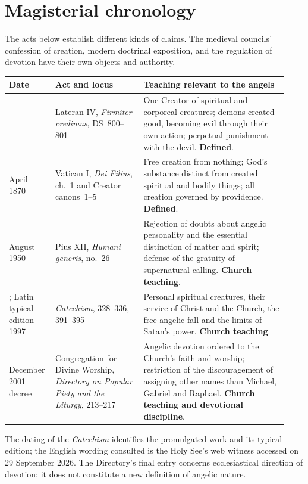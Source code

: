 \section{Magisterial chronology}
\label{app:magisterium}

The acts below establish different kinds of claims. The medieval councils'
confession of creation, modern doctrinal exposition, and the regulation of
devotion have their own objects and authority.

\begin{longtable}{@{}>{\raggedright\arraybackslash}p{0.14\linewidth}>{\raggedright\arraybackslash}p{0.30\linewidth}>{\raggedright\arraybackslash}p{0.49\linewidth}@{}}
\toprule
Date & Act and locus & Teaching relevant to the angels\\
\midrule\endhead
1215 & Lateran IV, \emph{Firmiter credimus}, DS~800--801 &
One Creator of spiritual and corporeal creatures; demons created good,
becoming evil through their own action; perpetual punishment with the devil.
\textbf{Defined}.\\
24 April 1870 & Vatican I, \emph{Dei Filius}, ch.~1 and Creator canons~1--5 &
Free creation from nothing; God's substance distinct from created spiritual
and bodily things; all creation governed by providence.
\textbf{Defined}.\\
12 August 1950 & Pius XII, \emph{Humani generis}, no.~26 &
Rejection of doubts about angelic personality and the essential distinction
of matter and spirit; defense of the gratuity of supernatural calling.
\textbf{Church teaching}.\\
1992; Latin typical edition 1997 & \emph{Catechism}, 328--336, 391--395 &
Personal spiritual creatures, their service of Christ and the Church,
the free angelic fall and the limits of Satan's power.
\textbf{Church teaching}.\\
17 December 2001 decree & Congregation for Divine Worship,
\emph{Directory on Popular Piety and the Liturgy}, 213--217 &
Angelic devotion ordered to the Church's faith and worship; restriction of
the discouragement of assigning other names than Michael, Gabriel and Raphael.
\textbf{Church teaching and devotional discipline}.\\
\bottomrule
\end{longtable}

The dating of the \emph{Catechism} identifies the promulgated work and its
typical edition; the English wording consulted is the Holy See's web witness
accessed on 29 September 2026. The Directory's final entry concerns
ecclesiastical direction of devotion; it does not constitute a new definition
of angelic nature.
